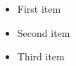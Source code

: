 \documentclass{article}
\begin{document}
\begin{itemize}
  \item First item
  \item Second item
  \item Third item
\end{itemize}
\end{document}

